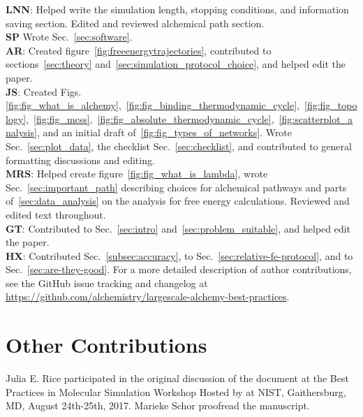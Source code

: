 \documentclass[9pt,bestpractices,pubversion]{livecoms}
\newcommand{\githubrepository}{\url{https://github.com/alchemistry/largescale-alchemy-best-practices}} %
\begin{document}
\textbf{LNN}: Helped write the simulation length, stopping conditions, and information saving section. Edited and reviewed alchemical path section.\\
\textbf{SP} Wrote Sec.~\ref{sec:software}. \\
\textbf{AR}: Created figure~\ref{fig:freeenergytrajectories}, contributed to sections~\ref{sec:theory} and~\ref{sec:simulation_protocol_choice}, and helped edit the paper.\\
\textbf{JS}: Created Figs.~ \ref{fig:fig_what_is_alchemy},~\ref{fig:fig_binding_thermodynamic_cycle},~\ref{fig:fig_topology},~\ref{fig:fig_mcss},~\ref{fig:fig_absolute_thermodynamic_cycle},~\ref{fig:scatterplot_analysis}, and an initial draft of~\ref{fig:fig_types_of_networks}. Wrote Sec.~\ref{sec:plot_data}, the checklist Sec.~\ref{sec:checklist}, and contributed to general formatting discussions and editing.\\
\textbf{MRS}: Helped create figure~\ref{fig:fig_what_is_lambda}, wrote Sec.~\ref{sec:important_path} describing choices for alchemical pathways and parts of~\ref{sec:data_analysis} on the analysis for free energy calculations. Reviewed and edited text throughout.\\
\textbf{GT}: Contributed to Sec.~\ref{sec:intro} and~\ref{sec:problem_suitable}, and helped edit the paper.\\
\textbf{HX}: Contributed Sec.~\ref{subsec:accuracy}, to Sec.~\ref{sec:relative-fe-protocol}, and to Sec.~\ref{sec:are-they-good}.
For a more detailed description of author contributions,
see the GitHub issue tracking and changelog at \githubrepository.

\section*{Other Contributions}
%
Julia E. Rice participated in the original discussion of the document at the Best Practices in Molecular Simulation Workshop Hosted by at NIST, Gaithersburg, MD, August 24th-25th, 2017.
Marieke Schor proofread the manuscript. 
\end{document}
